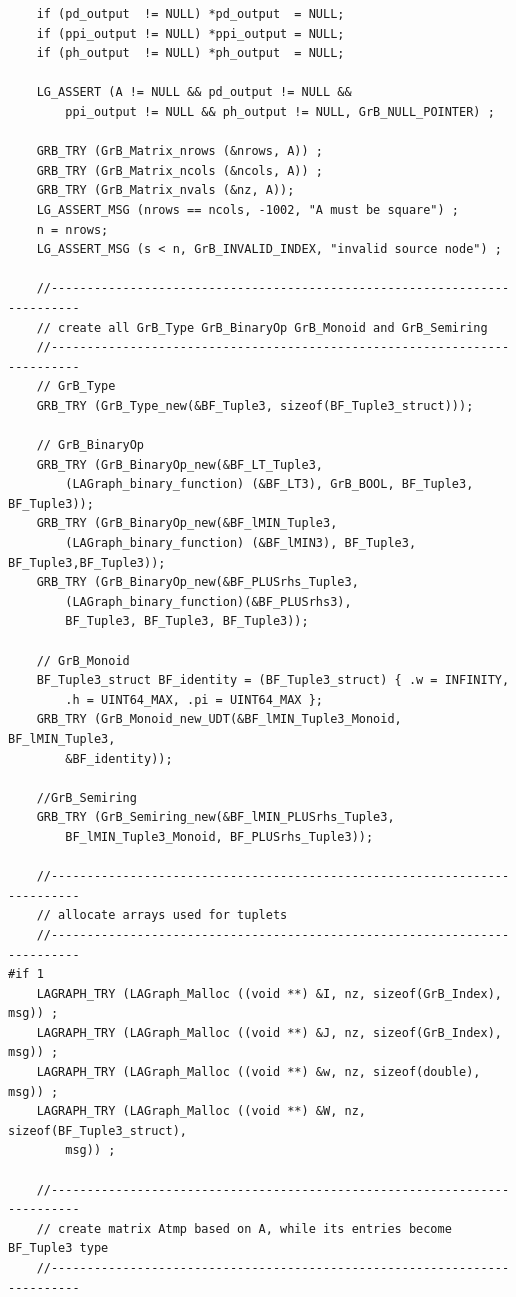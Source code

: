 \begin{verbatim}
    if (pd_output  != NULL) *pd_output  = NULL;
    if (ppi_output != NULL) *ppi_output = NULL;
    if (ph_output  != NULL) *ph_output  = NULL;

    LG_ASSERT (A != NULL && pd_output != NULL &&
        ppi_output != NULL && ph_output != NULL, GrB_NULL_POINTER) ;

    GRB_TRY (GrB_Matrix_nrows (&nrows, A)) ;
    GRB_TRY (GrB_Matrix_ncols (&ncols, A)) ;
    GRB_TRY (GrB_Matrix_nvals (&nz, A));
    LG_ASSERT_MSG (nrows == ncols, -1002, "A must be square") ;
    n = nrows;
    LG_ASSERT_MSG (s < n, GrB_INVALID_INDEX, "invalid source node") ;

    //--------------------------------------------------------------------------
    // create all GrB_Type GrB_BinaryOp GrB_Monoid and GrB_Semiring
    //--------------------------------------------------------------------------
    // GrB_Type
    GRB_TRY (GrB_Type_new(&BF_Tuple3, sizeof(BF_Tuple3_struct)));

    // GrB_BinaryOp
    GRB_TRY (GrB_BinaryOp_new(&BF_LT_Tuple3,
        (LAGraph_binary_function) (&BF_LT3), GrB_BOOL, BF_Tuple3, BF_Tuple3));
    GRB_TRY (GrB_BinaryOp_new(&BF_lMIN_Tuple3,
        (LAGraph_binary_function) (&BF_lMIN3), BF_Tuple3, BF_Tuple3,BF_Tuple3));
    GRB_TRY (GrB_BinaryOp_new(&BF_PLUSrhs_Tuple3,
        (LAGraph_binary_function)(&BF_PLUSrhs3),
        BF_Tuple3, BF_Tuple3, BF_Tuple3));

    // GrB_Monoid
    BF_Tuple3_struct BF_identity = (BF_Tuple3_struct) { .w = INFINITY,
        .h = UINT64_MAX, .pi = UINT64_MAX };
    GRB_TRY (GrB_Monoid_new_UDT(&BF_lMIN_Tuple3_Monoid, BF_lMIN_Tuple3,
        &BF_identity));

    //GrB_Semiring
    GRB_TRY (GrB_Semiring_new(&BF_lMIN_PLUSrhs_Tuple3,
        BF_lMIN_Tuple3_Monoid, BF_PLUSrhs_Tuple3));

    //--------------------------------------------------------------------------
    // allocate arrays used for tuplets
    //--------------------------------------------------------------------------
#if 1
    LAGRAPH_TRY (LAGraph_Malloc ((void **) &I, nz, sizeof(GrB_Index), msg)) ;
    LAGRAPH_TRY (LAGraph_Malloc ((void **) &J, nz, sizeof(GrB_Index), msg)) ;
    LAGRAPH_TRY (LAGraph_Malloc ((void **) &w, nz, sizeof(double), msg)) ;
    LAGRAPH_TRY (LAGraph_Malloc ((void **) &W, nz, sizeof(BF_Tuple3_struct),
        msg)) ;

    //--------------------------------------------------------------------------
    // create matrix Atmp based on A, while its entries become BF_Tuple3 type
    //--------------------------------------------------------------------------


\end{verbatim}
